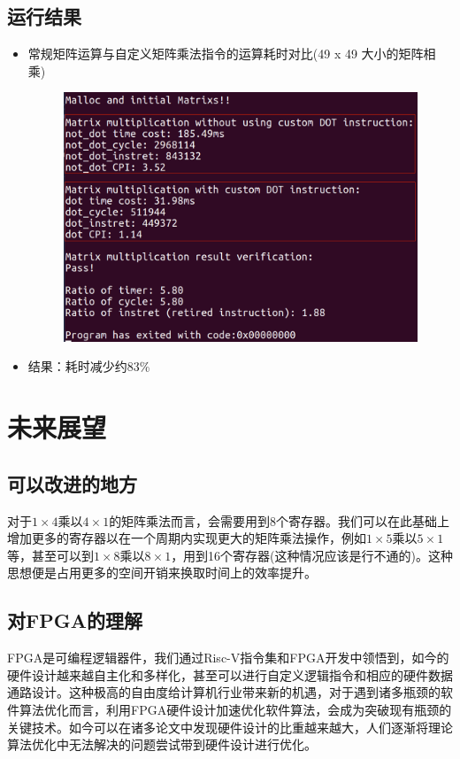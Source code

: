 \documentclass[a4paper, 14pt, oneside]{book} %
\numberwithin{equation}{subsection}
\begin{document}
	\subsection{运行结果}
		\begin{itemize}
			\item 
				常规矩阵运算与自定义矩阵乘法指令的运算耗时对比(49 x 49 大小的矩阵相乘)
				\begin{figure}[!htbp]
					\centering
					\includegraphics[scale=0.4]{img/result.png}
				\end{figure}
			\item 
				结果：耗时减少约83\%
		\end{itemize}

	\section{未来展望}
	\subsection{可以改进的地方}
	对于$1\times4$乘以$4\times1$的矩阵乘法而言，会需要用到8个寄存器。我们可以在此基础上增加更多的寄存器以在一个周期内实现更大的矩阵乘法操作，例如$1\times5$乘以$5\times1$等，甚至可以到$1\times8$乘以$8\times1$，用到16个寄存器(这种情况应该是行不通的)。这种思想便是占用更多的空间开销来换取时间上的效率提升。
	
	\subsection{对FPGA的理解}
	FPGA是可编程逻辑器件，我们通过Risc-V指令集和FPGA开发中领悟到，如今的硬件设计越来越自主化和多样化，甚至可以进行自定义逻辑指令和相应的硬件数据通路设计。这种极高的自由度给计算机行业带来新的机遇，对于遇到诸多瓶颈的软件算法优化而言，利用FPGA硬件设计加速优化软件算法，会成为突破现有瓶颈的关键技术。如今可以在诸多论文中发现硬件设计的比重越来越大，人们逐渐将理论算法优化中无法解决的问题尝试带到硬件设计进行优化。
	
	
\end{document}
